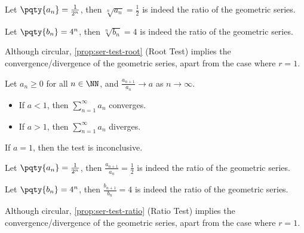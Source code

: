 \begin{example}
    \label{ex:ser-test-root-geo}%
    Let \(\pqty{a_n} = \frac{1}{2^n}\), then \(\sqrt[n]{a_n} = \frac{1}{2}\) is indeed the ratio of the geometric series.

    Let \(\pqty{b_n} = 4^n\), then \(\sqrt[n]{b_n} = 4\) is indeed the ratio of the geometric series.

    Although circular, \autoref{prop:ser-test-root} (Root Test) implies the convergence/divergence of the geometric series, apart from the case where \(r = 1\).
\end{example}

\begin{proposition}
    \label{prop:ser-test-ratio}%
    Let \(a_n \geq 0\) for all \(n \in \NN\), and \(\frac{a_{n + 1}}{a_n} \to a\) as \(n \to \infty\).

    \begin{itemize}
        \item If \(a < 1\), then \(\sum_{n = 1}^{\infty} a_n\) converges.
        \item If \(a > 1\), then \(\sum_{n = 1}^{\infty} a_n\) diverges.
    \end{itemize}
\end{proposition}

\begin{remark}
    If \(a = 1\), then the test is inconclusive.
\end{remark}

\begin{example}
    \label{ex:ser-test-ratio-geo}%
    Let \(\pqty{a_n} = \frac{1}{2^n}\), then \(\frac{a_{n + 1}}{a_n} = \frac{1}{2}\) is indeed the ratio of the geometric series.

    Let \(\pqty{b_n} = 4^n\), then \(\frac{b_{n + 1}}{b_n} = 4\) is indeed the ratio of the geometric series.

    Although circular, \autoref{prop:ser-test-ratio} (Ratio Test) implies the convergence/divergence of the geometric series, apart from the case where \(r = 1\).
\end{example}

